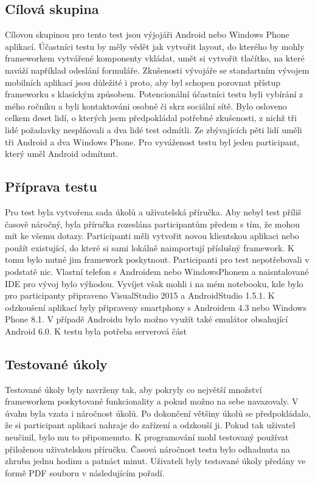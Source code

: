 \subsection{Cílová skupina}
Cílovou skupinou pro tento test jsou výjojáři Android nebo Windows Phone aplikací. Účastníci testu by měly vědět jak vytvořit layout, do kterého by mohly frameworkem vytvářené komponenty vkládat, umět si vytvořit tlačítko, na které naváží například odeslání formuláře. Zkušenosti vývojáře se standartním vývojem mobilních aplikací jsou důležité i proto, aby byl schopen porovnat přístup frameworku s klasickým způsobem. Potencionální účastníci testu byli vybírání z mého ročníku a byli kontaktováni osobně či skrz sociální sítě. Bylo osloveno celkem deset lidí, o kterých jsem předpokládal potřebné zkušenosti, z nichž tři lidé požadavky nesplňovali a dva lidé test odmítli. Ze zbývajících pěti lidí uměli tři Android a dva Windows Phone. Pro vyváženost testu byl jeden participant, který uměl Android odmítnut.    

\subsection{Příprava testu}
Pro test byla vytvořena sada úkolů a uživatelská příručka. Aby nebyl test příliš časově náročný, byla příručka rozeslána participantům předem s tím, že mohou mít ke všemu dotazy. Participanti měli vytvořit novou klientskou aplikaci nebo použít existující, do které si sami lokálně naimportují příslušný framework. K tomu bylo nutné jim framework poskytnout. Participanti pro test nepotřebovali v podstatě nic. Vlastní telefon s Androidem nebo WindowsPhonem a naisntalované IDE pro vývoj bylo výhodou. Vyvíjet však mohli i na mém notebooku, kde bylo pro participanty připraveno VisualStudio 2015 a AndroidStudio 1.5.1. K odzkoušení aplikací byly připraveny smartphony s Androidem 4.3 nebo Windows Phone 8.1. V případě Androidu bylo možno využít také emulátor obsahující Android 6.0. K testu byla potřeba serverová část
 
\subsection{Testované úkoly}
Testované úkoly byly navrženy tak, aby pokryly co největší množství frameworkem poskytované funkcionality a pokud možno na sebe navazovaly. V úvahu byla vzata i náročnost úkolů. Po dokončení většiny úkolů se předpokládalo, že si participant aplikaci nahraje do zařízení a odzkouší ji. Pokud tak uživatel neučinil, bylo mu to připomenuto. K programování mohl testovaný používat přiloženou uživatelskou příručku. Časová náročnost testu bylo odhadnuta na zhruba jednu hodinu a patnáct minut. Uživateli byly testované úkoly předány ve formě PDF souboru v následujícím pořadí.

